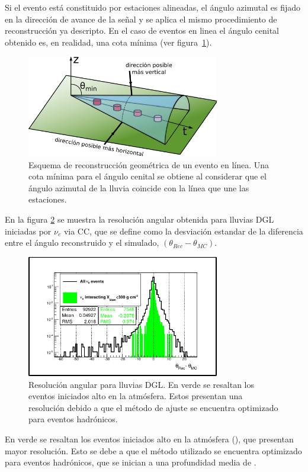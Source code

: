 	Si el evento está constituido por estaciones alineadas, el ángulo azimutal es fijado en la dirección de avance de la señal y se aplica el mismo procedimiento de reconstrucción ya descripto.
	En el caso de eventos en linea el ángulo cenital obtenido es, en realidad, una cota mínima (ver figura~\ref{fig:conoLineEvent}).
	\begin{figure}[ht]
	\begin{center}
	\includegraphics[width=0.75\textwidth]{fig/seleccionAuger/conoLineEvent.pdf}
	\caption{Esquema de reconstrucción geométrica de un evento en l\'inea. Una cota mínima para el ángulo cenital se obtiene al considerar que el ángulo azimutal de la lluvia coincide con la l\'inea que une las estaciones.}
	\label{fig:conoLineEvent}
	\end{center}
	\end{figure} 
	
	En la figura \ref{fig:resDGL} se muestra la resolución angular obtenida para lluvias DGL iniciadas por $\nu_e$ via CC, que se define como la desviación estandar de la diferencia entre el ángulo reconstruido y el simulado, $(\theta_{Rec}-\theta_{MC})$.
	\begin{figure}[ht]
	\begin{center}
	\includegraphics[width=0.75\textwidth]{fig/seleccionAuger/resDGL.pdf}
	\caption{Resolución angular para lluvias DGL. En verde se resaltan los eventos iniciados alto en la atmósfera. Estos presentan una resolución debido a que el método de ajuste se encuentra optimizado para eventos hadrónicos.}
	\label{fig:resDGL}
	\end{center}
	\end{figure}
	En verde se resaltan los eventos iniciados alto en la atmósfera (), que presentan mayor resolución. 
	Esto se debe a que el método utilizado se encuentra optimizado para eventos hadrónicos, que se inician a una profundidad media de .
	
